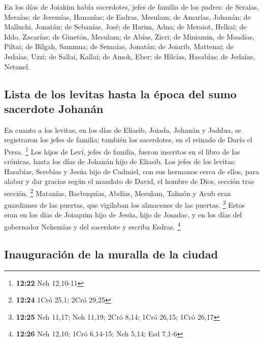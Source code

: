  En los días de Joiakim había sacerdotes, jefes de
familia de los padres: de Seraías, Meraías; de Jeremías, Hananías;
 de Esdras, Mesulam; de Amarías, Johanán; 
de Malluchi, Jonatán; de Sebanías, José;  de Harim, Adna;
de Meraiot, Helkai;  de Iddo, Zacarías; de Ginetón,
Mesulam;  de Abías, Zicri; de Miniamin, de Moadías,
Piltai;  de Bilgah, Sammua; de Semaías, Jonatán;
 de Joiarib, Mattenai; de Jedaías, Uzzi; 
de Sallai, Kallai; de Amok, Eber;  de Hilcías, Hasabías;
de Jedaías, Netanel.

\hypertarget{lista-de-los-levitas-hasta-la-uxe9poca-del-sumo-sacerdote-johanuxe1n}{%
\subsection{Lista de los levitas hasta la época del sumo sacerdote
Johanán}\label{lista-de-los-levitas-hasta-la-uxe9poca-del-sumo-sacerdote-johanuxe1n}}

 En cuanto a los levitas, en los días de Eliasib, Joiada,
Johanán y Jaddua, se registraron los jefes de familia; también los
sacerdotes, en el reinado de Darío el Persa. \footnote{\textbf{12:22}
  Neh 12,10-11}  Los hijos de Leví, jefes de familia,
fueron inscritos en el libro de las crónicas, hasta los días de Johanán
hijo de Eliasib.  Los jefes de los levitas: Hasabías,
Serebías y Jesúa hijo de Cadmiel, con sus hermanos cerca de ellos, para
alabar y dar gracias según el mandato de David, el hombre de Dios,
sección tras sección. \footnote{\textbf{12:24} 1Cró 25,1; 2Cró 29,25}
 Matanías, Bacbuquías, Abdías, Mesulam, Talmón y Acub
eran guardianes de las puertas, que vigilaban los almacenes de las
puertas. \footnote{\textbf{12:25} Neh 11,17; Neh 11,19; 2Cró 8,14; 1Cró
  26,15; 1Cró 26,17}  Estos eran en los días de Joiaquim
hijo de Jesúa, hijo de Josadac, y en los días del gobernador Nehemías y
del sacerdote y escriba Esdras. \footnote{\textbf{12:26} Neh 12,10; 1Cró
  6,14-15; Neh 5,14; Esd 7,1-6}

\hypertarget{inauguraciuxf3n-de-la-muralla-de-la-ciudad}{%
\subsection{Inauguración de la muralla de la
ciudad}\label{inauguraciuxf3n-de-la-muralla-de-la-ciudad}}


